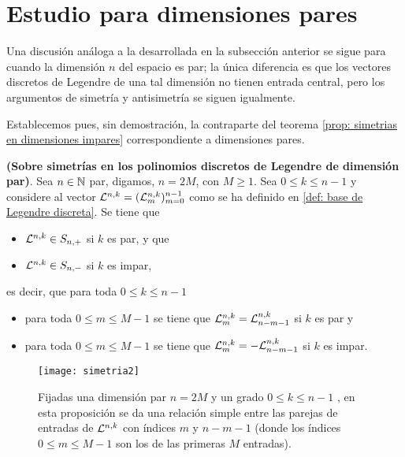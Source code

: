 \section{Estudio para dimensiones pares}
Una discusión análoga a la desarrollada en la subsección
anterior se sigue para cuando la dimensión $n$ del espacio
es par; la única diferencia es que los vectores discretos
de Legendre de una tal dimensión no tienen entrada central,
pero los argumentos de simetría y antisimetría se siguen
igualmente.

Establecemos pues, sin demostración, 
la contraparte del teorema
\ref{prop: simetrias en dimensiones impares} 
correspondiente a dimensiones pares.


\begin{teo}
\label{prop: simetrias en dimensiones pares}
\textbf{(Sobre simetrías
en los polinomios discretos de Legendre de dimensión par)}.
Sea $n \in \mathbb{N}$ par, digamos,
$n=2M$, con $M \geq 1$. Sea $0 \leq k \leq n-1$ y
considere al vector $\mathcal{L}^{n,k}=(\mathcal{L}^{n,k}_{m})_{m=0}^{n-1}$
como se ha definido en \ref{def: base de Legendre discreta}.
Se tiene que 
\begin{itemize}
\item $\mathcal{L}^{n,k} \in S_{n,+}$ si $k$ es par, y que
\item $\mathcal{L}^{n,k} \in S_{n,-}$ si $k$ es impar,
\end{itemize}
es decir, que para toda $0 \leq k \leq n-1$ 

\begin{itemize}
\item para toda $0 \leq m \leq M-1$ se tiene que 
$\mathcal{L}^{n,k}_{m} = \mathcal{L}^{n,k}_{n-m-1}$ si $k$ es par y
\item para toda $0 \leq m \leq M-1$ 
se tiene que $\mathcal{L}^{n,k}_{m} = -\mathcal{L}^{n,k}_{n-m-1}$ si $k$ es impar.
\end{itemize}

\end{teo}
\begin{figure}[H]
\centering\captionsetup{format = hang}
	\begin{measuredfigure}
		\texttt{[image: simetria2]} 
		\caption{Fijadas una dimensión par $n=2M$ 
		y un grado $0 \leq k \leq n-1$ ,
		en esta proposición se da una relación simple entre las parejas 
		de entradas de $\mathcal{L}^{n,k}$ con índices $m$ y $n-m-1$ 
		(donde los índices $0 \leq m \leq M-1$ son los de las primeras
		$M$ entradas).}
 	\end{measuredfigure}
 \end{figure}